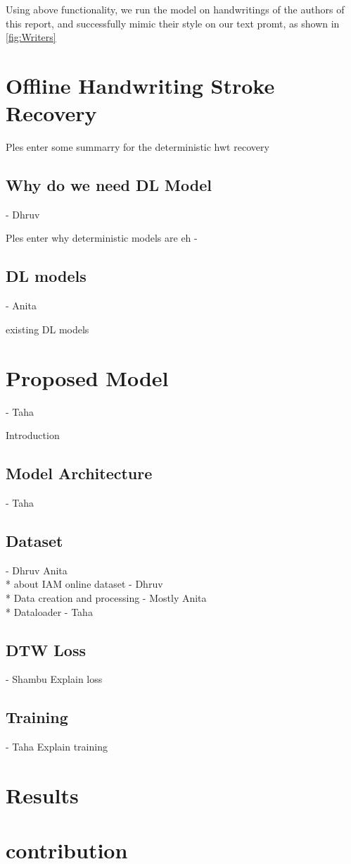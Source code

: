 \documentclass[10pt,twocolumn,letterpaper]{article}
\begin{document}
Using above functionality, we run the model on handwritings of the authors of this report, and successfully mimic their style on our text promt, as shown in \ref{fig:Writers} 

\section{Offline Handwriting Stroke Recovery}  

Ples enter some summarry for the deterministic hwt recovery

\subsection{Why do we need DL Model}  - Dhruv

Ples enter why deterministic models are eh - 

\subsection{DL models} - Anita

existing DL models 

\section{Proposed Model} - Taha

Introduction 

\subsection{Model Architecture} - Taha

\subsection{Dataset} - Dhruv Anita \\
* about IAM online dataset - Dhruv \\
* Data creation and processing - Mostly Anita \\
* Dataloader - Taha \\

\subsection{DTW Loss} - Shambu
Explain loss 

\subsection{Training} - Taha
 Explain training
\section{Results}

\section{contribution}

{\small


}
\end{document}
